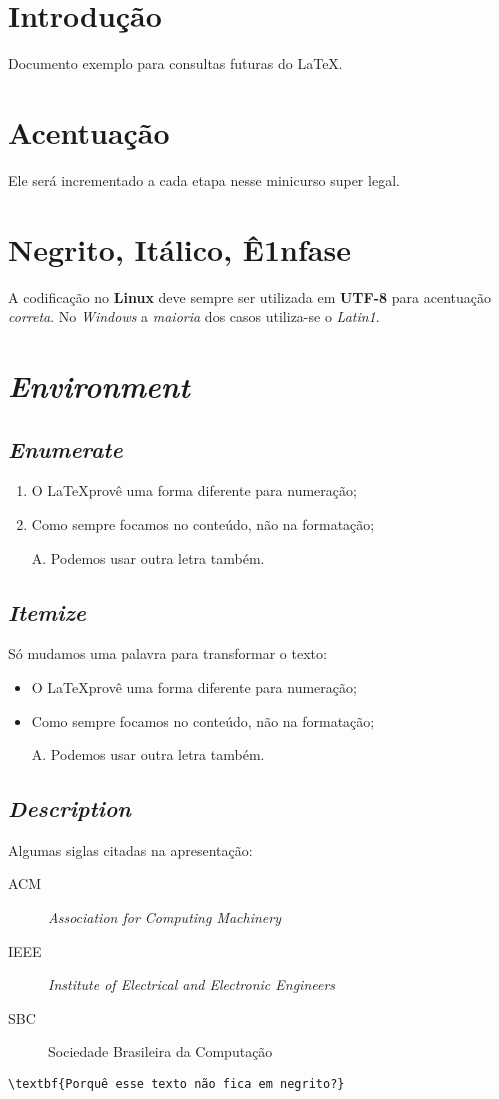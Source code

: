 \documentclass{article}
\begin{document}
	\section{Introdução}
		Documento exemplo para consultas futuras do \LaTeX.

	\section{Acentuação}		
		Ele será incrementado a cada etapa nesse minicurso super legal.
	
	\section{Negrito, Itálico, Ê1nfase}
		A codificação no \textbf{Linux} deve \huge sempre \normalsize ser utilizada em \textbf{UTF-8} para acentuação \emph{correta}. No \textit{Windows} a \emph{maioria} dos casos utiliza-se o \textit{Latin1}.
		
	\section{\textit{Environment}}

		\subsection{\textit{Enumerate}}
			\begin{enumerate}
				\item	O \LaTeX provê uma forma diferente para numeração;
				\item	Como sempre focamos no conteúdo, não na formatação;
				\item[A.]	Podemos usar outra letra também.
			\end{enumerate}
	
		\subsection{\textit{Itemize}}
			Só mudamos uma palavra para transformar o texto:
			\begin{itemize}
				\item	O \LaTeX provê uma forma diferente para numeração;
				\item	Como sempre focamos no conteúdo, não na formatação;
				\item[A.]	Podemos usar outra letra também.
			\end{itemize}
	
		\subsection{\textit{Description}}
			Algumas siglas citadas na apresentação:
			\begin{description}
				\item[ACM] \textit{Association for Computing Machinery}
				\item[IEEE]	\textit{Institute of Electrical and Electronic Engineers}
				\item[SBC] Sociedade Brasileira da Computação
			\end{description}

		\verb|\textbf{Porquê esse texto não fica em negrito?}|
\end{document}
